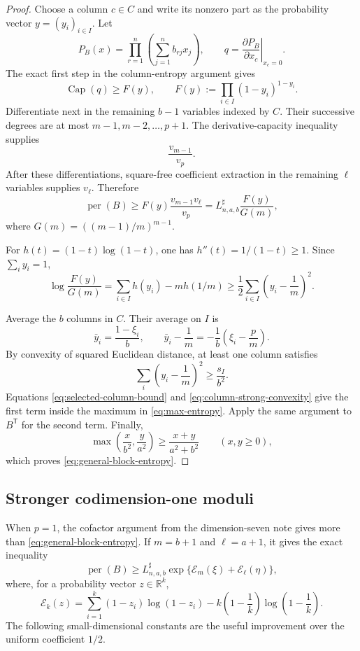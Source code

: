 \documentclass[11pt]{article}
\theoremstyle{definition}
\newcommand{\per}{\operatorname{per}}
\newcommand{\pcap}{\operatorname{Cap}}
\begin{document}
\begin{proof}
Choose a column $c\in C$ and write its nonzero part as the probability vector
$y=(y_i)_{i\in I}$.  Let
\[
 P_B(x)=\prod_{r=1}^n\left(\sum_{j=1}^n b_{rj}x_j\right),
 \qquad
 q=\left.\frac{\partial P_B}{\partial x_c}\right|_{x_c=0}.
\]
The exact first step in the column-entropy argument gives
\[
 \pcap(q)\ge F(y),
 \qquad
 F(y):=\prod_{i\in I}(1-y_i)^{1-y_i}.
 \tag{2.4}\label{eq:first-column-cap}
\]
Differentiate next in the remaining $b-1$ variables indexed by $C$.  Their
successive degrees are at most
$m-1,m-2,\ldots,p+1$.  The derivative-capacity inequality supplies
\[
 \frac{v_{m-1}}{v_p}.
\]
After these differentiations, square-free coefficient extraction in the
remaining $\ell$ variables supplies $v_\ell$.  Therefore
\[
 \per(B)\ge F(y)\frac{v_{m-1}v_\ell}{v_p}
 =L^{\sharp}_{n,a,b}\frac{F(y)}{G(m)},
 \tag{2.5}\label{eq:selected-column-bound}
\]
where $G(m)=((m-1)/m)^{m-1}$.

For $h(t)=(1-t)\log(1-t)$, one has $h''(t)=1/(1-t)\ge1$.  Since
$\sum_i y_i=1$,
\[
 \log\frac{F(y)}{G(m)}
 =\sum_{i\in I}h(y_i)-m h(1/m)
 \ge\frac12\sum_{i\in I}\left(y_i-\frac1m\right)^2.
 \tag{2.6}\label{eq:column-strong-convexity}
\]

Average the $b$ columns in $C$.  Their average on $I$ is
\[
 \bar y_i=\frac{1-\xi_i}{b},
 \qquad
 \bar y_i-\frac1m=-\frac1b\left(\xi_i-\frac pm\right).
\]
By convexity of squared Euclidean distance, at least one column satisfies
\[
 \sum_i\left(y_i-\frac1m\right)^2\ge\frac{s_I}{b^2}.
\]
Equations \eqref{eq:selected-column-bound} and
\eqref{eq:column-strong-convexity} give the first term inside the maximum in
\eqref{eq:max-entropy}.  Apply the same argument to $B^{\mathsf T}$ for the
second term.  Finally,
\[
 \max\left(\frac{x}{b^2},\frac{y}{a^2}\right)
 \ge\frac{x+y}{a^2+b^2}
 \qquad(x,y\ge0),
\]
which proves \eqref{eq:general-block-entropy}.
\end{proof}

\subsection{Stronger codimension-one moduli}

When $p=1$, the cofactor argument from the dimension-seven note gives more
than \eqref{eq:general-block-entropy}.  If $m=b+1$ and $\ell=a+1$, it gives the
exact inequality
\[
 \per(B)\ge L^{\sharp}_{n,a,b}
 \exp\{\mathcal E_m(\xi)+\mathcal E_\ell(\eta)\},
 \tag{2.7}\label{eq:exact-p1-entropy}
\]
where, for a probability vector $z\in\mathbb R^k$,
\[
 \mathcal E_k(z)=
 \sum_{i=1}^k(1-z_i)\log(1-z_i)
 -k\left(1-\frac1k\right)\log\left(1-\frac1k\right).
 \tag{2.8}\label{eq:Ek}
\]
The following small-dimensional constants are the useful improvement over the
uniform coefficient $1/2$.
\end{document}
